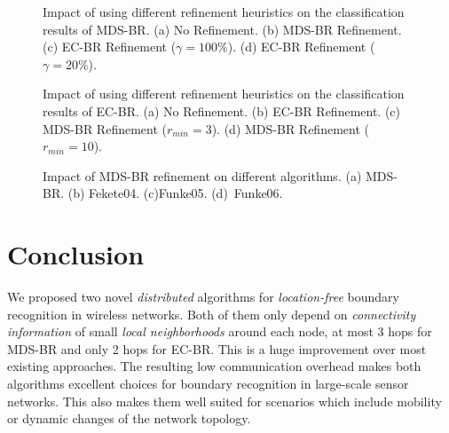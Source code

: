 \documentclass{llncs}
\begin{document}
\begin{figure}[p]
\centering
\hfill
{}
\hfill
{}
\hfill
{}
\hfill
{}
\hfill{}
\caption{Impact of using different refinement heuristics on the classification results of MDS-BR. (a) No Refinement. (b) MDS-BR Refinement. (c) EC-BR Refinement ($\gamma=100\%$). (d) EC-BR Refinement ($\gamma=20\%$).}
\label{fig:refinement_mdsbr}
\end{figure}

\begin{figure}[p]
\centering
\hfill
{}
\hfill
{}
\hfill
{}
\hfill
{}
\hfill{}
\caption{Impact of using different refinement heuristics on the classification results of EC-BR. (a) No Refinement. (b) EC-BR Refinement. (c) MDS-BR Refinement ($r_{min} = 3$). (d) MDS-BR Refinement ($r_{min} = 10$).}
\label{fig:refinement_ecbr}
\end{figure}

\begin{figure}[p]
\centering
\hfill
{}
\hfill
{}
\hfill
{}
\hfill
{}
\hfill{}
\caption{Impact of MDS-BR refinement on different algorithms. (a) MDS-BR. (b) Fekete04. (c)Funke05. (d)~Funke06.}
\label{fig:refinements}
\end{figure}



\section{Conclusion}
We proposed two novel \emph{distributed} algorithms for \emph{location-free} boundary recognition in wireless networks.
Both of them only depend on \emph{connectivity information} of small \emph{local neighborhoods} around each node, at most 3 hops for MDS-BR and only 2 hops for EC-BR.
This is a huge improvement over most existing approaches.
The resulting low communication overhead makes both algorithms excellent choices for boundary recognition in large-scale sensor networks.
This also makes them well suited for scenarios which include mobility or dynamic changes of the network topology.
\end{document}
